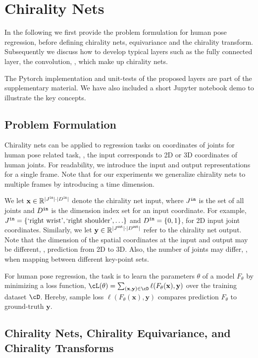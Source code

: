 \documentclass{article}
\def\rvx{{\mathbf{x}}}
\def\rvy{{\mathbf{y}}}
\begin{document}
\section{Chirality Nets}
\label{sec:app}

In the following we first provide the  problem formulation for human pose regression, before defining   chirality nets,  equivariance and the chirality transform. Subsequently we discuss how to develop typical layers such as the fully connected layer, the convolution, \etc, which make up chirality nets. 

The Pytorch implementation and unit-tests of the proposed layers are part of the supplementary material. We have also included a short Jupyter notebook demo to illustrate the key concepts.

\subsection{Problem Formulation}
Chirality nets can be applied to regression tasks on  coordinates of joints for human pose related task, \ie, the input corresponds to 2D or 3D coordinates of human joints. For readability, we introduce the input and output representations for a single frame. Note that for our experiments we generalize chirality nets  to multiple frames by introducing a time dimension. 

We let $\rvx \in \mathbb{R}^{|J^{\tt in}|\cdot|D^{\tt in}|}$ denote the chirality net input, where $J^{\tt in}$ is the set of all joints and $D^{\tt in}$ is the dimension index set for an input coordinate. For example, $J^{\tt in} = \{\text{`right wrist'},  \text{`right shoulder'}, \ldots\}$ and $D^{\tt in} = \{0, 1\}$, for 2D  input joint coordinates.  Similarly, we let  $\rvy \in \mathbb{R}^{|J^{\tt out}|\cdot|D^{\tt out}|}$ refer to the chirality net output. Note that the dimension of the spatial coordinates at the input and output may be different, \eg, prediction from 2D to 3D. Also, the  number of joints may differ, \eg, when mapping between different key-point sets. 

For human pose regression, the task is to learn the parameters $\theta$ of a model $F_\theta$ by minimizing a loss function, $\cL(\theta) = \sum_{(\rvx, \rvy) \in \cD} \ell(F_\theta(\rvx), \rvy)$ over the training dataset $\cD$. Hereby, sample loss $\ell(F_\theta(\rvx), \rvy)$ compares prediction $F_\theta$ to ground-truth $\rvy$.

\subsection{Chirality Nets, Chirality Equivariance, and Chirality Transforms}\label{seq:eq_def}
\end{document}
